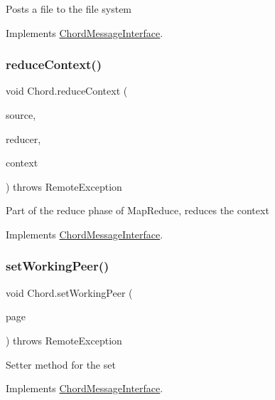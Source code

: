 Posts a file to the file system 

Implements \mbox{\hyperlink{interface_chord_message_interface}{Chord\+Message\+Interface}}.

\mbox{\label{class_chord_a8fef132c3b9323e35e6bca15153eda3e}} 
\subsubsection{\texorpdfstring{reduce\+Context()}{reduceContext()}}
{\footnotesize\ttfamily void Chord.\+reduce\+Context (\begin{DoxyParamCaption}\item[{Long}]{source,  }\item[{\mbox{\hyperlink{interface_map_reduce_interface}{Map\+Reduce\+Interface}}}]{reducer,  }\item[{\mbox{\hyperlink{interface_chord_message_interface}{Chord\+Message\+Interface}}}]{context }\end{DoxyParamCaption}) throws Remote\+Exception\hspace{0.3cm}{\ttfamily [inline]}}

Part of the reduce phase of Map\+Reduce, reduces the context 

Implements \mbox{\hyperlink{interface_chord_message_interface}{Chord\+Message\+Interface}}.

\mbox{\label{class_chord_a20d48291de1f865e57a65852e95f7a5e}} 
\subsubsection{\texorpdfstring{set\+Working\+Peer()}{setWorkingPeer()}}
{\footnotesize\ttfamily void Chord.\+set\+Working\+Peer (\begin{DoxyParamCaption}\item[{Long}]{page }\end{DoxyParamCaption}) throws Remote\+Exception\hspace{0.3cm}{\ttfamily [inline]}}

Setter method for the set 

Implements \mbox{\hyperlink{interface_chord_message_interface}{Chord\+Message\+Interface}}.

